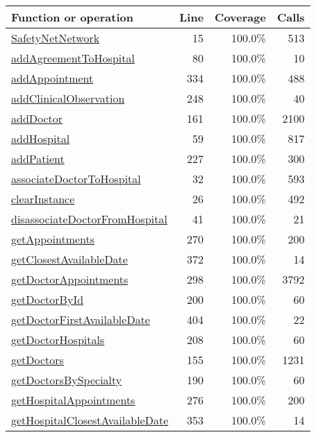 \bigskip
\begin{longtable}{|l|r|r|r|}
\hline
Function or operation & Line & Coverage & Calls \\
\hline
\hline
\hyperref[SafetyNetNetwork:15]{SafetyNetNetwork} & 15&100.0\% & 513 \\
\hline
\hyperref[addAgreementToHospital:80]{addAgreementToHospital} & 80&100.0\% & 10 \\
\hline
\hyperref[addAppointment:334]{addAppointment} & 334&100.0\% & 488 \\
\hline
\hyperref[addClinicalObservation:248]{addClinicalObservation} & 248&100.0\% & 40 \\
\hline
\hyperref[addDoctor:161]{addDoctor} & 161&100.0\% & 2100 \\
\hline
\hyperref[addHospital:59]{addHospital} & 59&100.0\% & 817 \\
\hline
\hyperref[addPatient:227]{addPatient} & 227&100.0\% & 300 \\
\hline
\hyperref[associateDoctorToHospital:32]{associateDoctorToHospital} & 32&100.0\% & 593 \\
\hline
\hyperref[clearInstance:26]{clearInstance} & 26&100.0\% & 492 \\
\hline
\hyperref[disassociateDoctorFromHospital:41]{disassociateDoctorFromHospital} & 41&100.0\% & 21 \\
\hline
\hyperref[getAppointments:270]{getAppointments} & 270&100.0\% & 200 \\
\hline
\hyperref[getClosestAvailableDate:372]{getClosestAvailableDate} & 372&100.0\% & 14 \\
\hline
\hyperref[getDoctorAppointments:298]{getDoctorAppointments} & 298&100.0\% & 3792 \\
\hline
\hyperref[getDoctorById:200]{getDoctorById} & 200&100.0\% & 60 \\
\hline
\hyperref[getDoctorFirstAvailableDate:404]{getDoctorFirstAvailableDate} & 404&100.0\% & 22 \\
\hline
\hyperref[getDoctorHospitals:208]{getDoctorHospitals} & 208&100.0\% & 60 \\
\hline
\hyperref[getDoctors:155]{getDoctors} & 155&100.0\% & 1231 \\
\hline
\hyperref[getDoctorsBySpecialty:190]{getDoctorsBySpecialty} & 190&100.0\% & 60 \\
\hline
\hyperref[getHospitalAppointments:276]{getHospitalAppointments} & 276&100.0\% & 200 \\
\hline
\hyperref[getHospitalClosestAvailableDate:353]{getHospitalClosestAvailableDate} & 353&100.0\% & 14 \\

\end{longtable}
